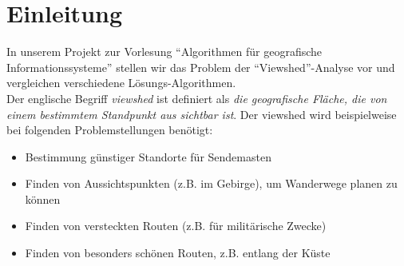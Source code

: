 \section{Einleitung}
In unserem Projekt zur Vorlesung ``Algorithmen für geografische Informationssysteme'' stellen wir das Problem der ``Viewshed''-Analyse vor und 
vergleichen verschiedene Lösungs-Algorithmen. \\ Der englische Begriff \textit{viewshed} ist definiert als \textit{die geografische Fläche, die 
von einem bestimmtem Standpunkt aus sichtbar ist}. Der viewshed wird beispielweise bei folgenden Problemstellungen benötigt:
\begin{itemize}
 \item Bestimmung günstiger Standorte für Sendemasten
 \item Finden von Aussichtspunkten (z.B. im Gebirge), um Wanderwege planen zu können
 \item Finden von versteckten Routen (z.B. für militärische Zwecke)
 \item Finden von besonders schönen Routen, z.B. entlang der Küste 
\end{itemize}

